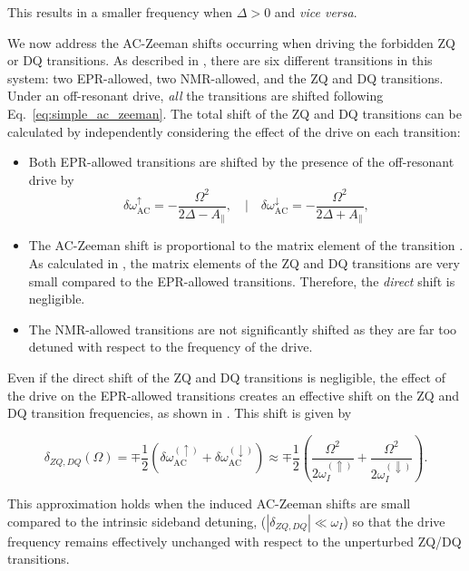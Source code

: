 This results in a smaller frequency when $\Delta>0$ and \textit{vice versa}.

We now address the AC-Zeeman shifts occurring when driving the forbidden ZQ or DQ transitions. As described in , there are six different transitions in this system: two EPR-allowed, two NMR-allowed, and the ZQ and DQ transitions. Under an off-resonant drive, \textit{all} the transitions are shifted following Eq.~\ref{eq:simple_ac_zeeman}. The total shift of the ZQ and DQ transitions can be calculated by independently considering the effect of the drive on each transition:

\begin{itemize}    
    \item Both EPR-allowed transitions are shifted by the presence of the off-resonant drive by
    \begin{equation}
        \delta\omega^{\uparrow}_\mathrm{AC} = -\frac{\Omega^2} {2\Delta - A_\parallel}, \quad | \quad \delta\omega^{\downarrow}_\mathrm{AC} = -\frac{\Omega^2} {2\Delta + A_\parallel},
    \end{equation}
    \item The AC-Zeeman shift is proportional to the matrix element of the transition \cite{haroche_exploring_2006}. As calculated in , the matrix elements of the ZQ and DQ transitions are very small compared to the EPR-allowed transitions. Therefore, the \textit{direct} shift is negligible.
    \item The NMR-allowed transitions are not significantly shifted as they are far too detuned with respect to the frequency of the drive.
\end{itemize}

Even if the direct shift of the ZQ and DQ transitions is negligible, the effect of the drive on the EPR-allowed transitions creates an effective shift on the ZQ and DQ transition frequencies, as shown in . This shift is given by

\begin{equation}
\delta_{ZQ, DQ}(\Omega) = \mp \frac{1}{2} \left(\delta\omega^{(\uparrow)}_\mathrm{AC} + \delta\omega^{(\downarrow)}_\mathrm{AC}\right) \approx \mp \frac{1}{2} \left(\frac{\Omega^{2}}{2\omega_I^{(\Uparrow)}} + \frac{\Omega^{2}}{2\omega_I^{(\Downarrow)}}\right).
\end{equation}

This approximation holds when the induced AC-Zeeman shifts are small compared to the intrinsic sideband detuning, ($|\delta_{ZQ,DQ}|\ll \omega_I$) so that the drive frequency remains effectively unchanged with respect to the unperturbed ZQ/DQ transitions.

